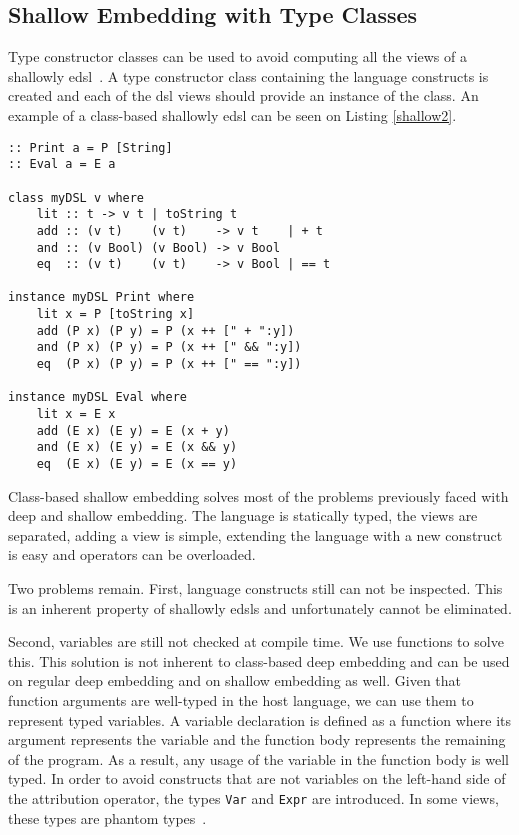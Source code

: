 \subsection{Shallow Embedding with Type Classes}\label{sec:class_based_edsl}

Type constructor classes can be used to avoid computing all the views of a shallowly \ac{edsl}~\cite{tagless}. A type constructor class containing the language constructs is created and each of the \ac{dsl} views should provide an instance of the class. An example of a class-based shallowly \ac{edsl} can be seen on Listing \ref{shallow2}.

\begin{lstlisting}[caption=A simple class-based shallowly \ac{edsl},captionpos=b,label=shallow2]
:: Print a = P [String]
:: Eval a = E a

class myDSL v where
    lit :: t -> v t | toString t
    add :: (v t)    (v t)    -> v t    | + t
    and :: (v Bool) (v Bool) -> v Bool
    eq  :: (v t)    (v t)    -> v Bool | == t
    
instance myDSL Print where
    lit x = P [toString x]
    add (P x) (P y) = P (x ++ [" + ":y])
    and (P x) (P y) = P (x ++ [" && ":y])
    eq  (P x) (P y) = P (x ++ [" == ":y])
    
instance myDSL Eval where
    lit x = E x
    add (E x) (E y) = E (x + y)
    and (E x) (E y) = E (x && y)
    eq  (E x) (E y) = E (x == y)
\end{lstlisting}

Class-based shallow embedding solves most of the problems previously faced with deep and shallow embedding. The language is statically typed, the views are separated, adding a view is simple, extending the language with a new construct is easy and operators can be overloaded. 

Two problems remain. First, language constructs still can not be inspected. This is an inherent property of shallowly \acp{edsl} and unfortunately cannot be eliminated. 

Second, variables are still not checked at compile time. We use functions to solve this. This solution is not inherent to class-based deep embedding and can be used on regular deep embedding and on shallow embedding as well. Given that function arguments are well-typed in the host language, we can use them to represent typed variables. A variable declaration is defined as a function where its argument represents the variable and the function body represents the remaining of the program. As a result, any usage of the variable in the function body is well typed. In order to avoid constructs that are not variables on the left-hand side of the attribution operator, the types \texttt{Var} and \texttt{Expr} are introduced. In some views, these types are phantom types~\cite{phantom}. 

